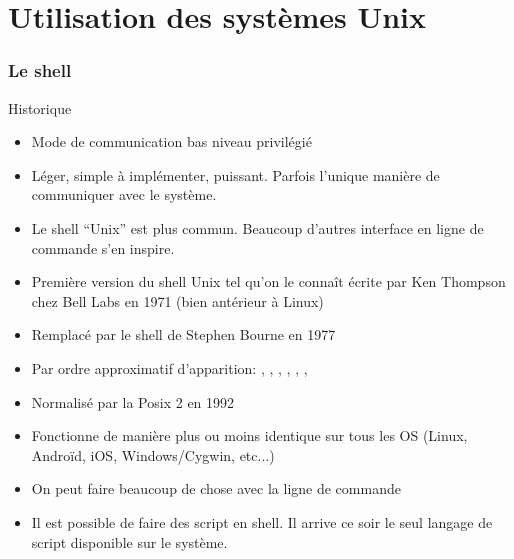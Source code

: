 %
%
%

\part{Utilisation des systèmes Unix}

\begin{frame}
  \partpage
\end{frame}

\begin{frame}
  \tableofcontents[currentpart]
\end{frame}

\section{Le shell}

\begin{frame}[fragile=singleslide]{Historique}
  \begin{itemize}
  \item Mode de communication bas niveau privilégié
  \item  Léger,  simple  à  implémenter, puissant.   Parfois  l'unique
    manière de communiquer avec le système.
  \item Le shell ``Unix'' est plus commun. Beaucoup d'autres interface
    en ligne de commande s'en inspire.
  \item Première version du shell Unix tel qu'on le connaît écrite par
    Ken Thompson chez Bell Labs en 1971 (bien antérieur à Linux)
  \item Remplacé par le shell de Stephen Bourne en 1977
  \item  Par  ordre  approximatif d'apparition:  ,  ,
    , , , , 
  \item Normalisé par la Posix 2 en 1992
  \item Fonctionne de manière plus  ou moins identique sur tous les OS
    (Linux, Androïd, iOS, Windows/Cygwin, etc...)
  \item On peut faire beaucoup de chose avec la ligne de commande
  \item Il  est possible de  faire des script  en shell. Il  arrive ce
    soir le seul langage de script disponible sur le système.
  \end{itemize}
\end{frame}

